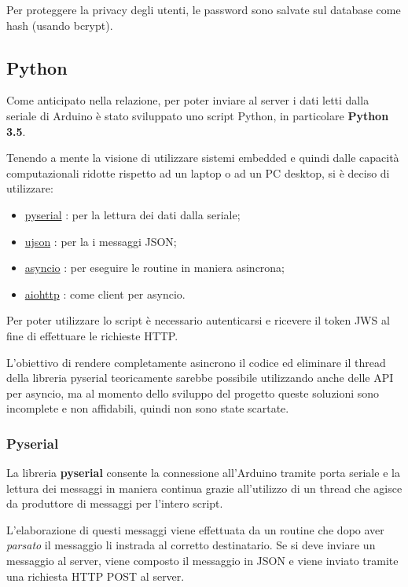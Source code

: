 Per proteggere la privacy degli utenti, le password sono salvate sul database come hash (usando bcrypt).

\subsection{Python}
Come anticipato nella relazione, per poter inviare al server i dati letti dalla seriale di Arduino è stato sviluppato uno script Python, in particolare \textbf{Python 3.5}.

Tenendo a mente la visione di utilizzare sistemi embedded e quindi dalle capacità computazionali ridotte rispetto ad un laptop o ad un PC desktop, si è deciso di utilizzare:
\begin{itemize}
	\item \href{https://github.com/pyserial/pyserial}{pyserial} : per la lettura dei dati dalla seriale;
	\item \href{https://github.com/pyserial/pyserial}{ujson} : per la i messaggi JSON;
	\item \href{https://github.com/python/asyncio}{asyncio} : per eseguire le routine in maniera asincrona;
	\item \href{https://github.com/KeepSafe/aiohttp}{aiohttp} : come client per asyncio.
\end{itemize}

Per poter utilizzare lo script è necessario autenticarsi e ricevere il token JWS al fine di effettuare le richieste HTTP.

L'obiettivo di rendere completamente asincrono il codice ed eliminare il thread della libreria pyserial teoricamente sarebbe possibile utilizzando anche delle API per asyncio, ma al momento dello sviluppo del progetto queste soluzioni sono incomplete e non affidabili, quindi non sono state scartate.

\subsubsection{Pyserial}
La libreria \textbf{pyserial} consente la connessione all'Arduino tramite porta seriale e la lettura dei messaggi in maniera continua grazie all'utilizzo di un thread che agisce da produttore di messaggi per l'intero script.

L'elaborazione di questi messaggi viene effettuata da un routine che dopo aver \textit{parsato} il messaggio li instrada al corretto destinatario. Se si deve inviare un messaggio al server, viene composto il messaggio in JSON e viene inviato tramite una richiesta HTTP POST al server.

